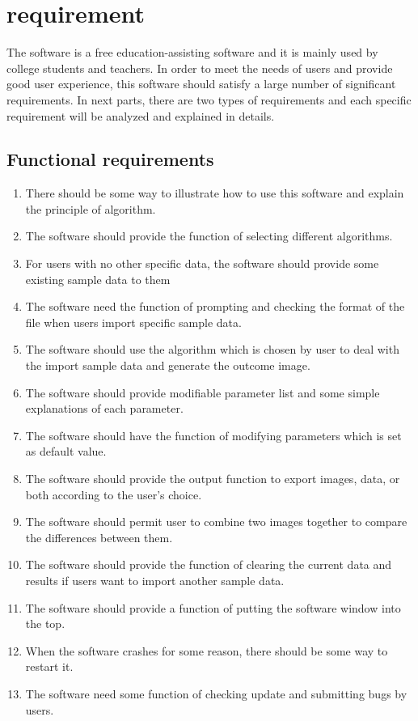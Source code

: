 \documentclass[11pt,oneside,a4paper]{article}
\begin{document}
\section{requirement}
The software is a free education-assisting software and it is mainly used by college students and teachers. In order to meet the needs of users and provide good user experience, this software should satisfy a large number of significant requirements. In next parts, there are two types of requirements and each specific requirement will be analyzed and explained in details.
\subsection{Functional requirements}

\begin{enumerate}
\item There should be some way to illustrate how to use this software and explain the principle of algorithm.
\item 	The software should provide the function of selecting different algorithms.
\item For users with no other specific data, the software should provide some existing sample data to them
\item The software need the function of prompting and checking the format of the file when users import specific sample data.
\item The software should use the algorithm which is chosen by user to deal with the import sample data and generate the outcome image.
\item 	The software should provide modifiable parameter list and some simple explanations of each parameter.
\item 	The software should have the function of modifying parameters which is set as default value.
\item 	The software should provide the output function to export images, data, or both according to the user's choice.
\item 	The software should permit user to combine two images together to compare the differences between them.
\item 	The software should provide the function of clearing the current data and results if users want to import another sample data.
\item 	The software should provide a function of putting the software window into the top.
\item 	When the software crashes for some reason, there should be some way to restart it.
\item 	The software need some function of checking update and submitting bugs by users.
\end{enumerate}
\end{document}
